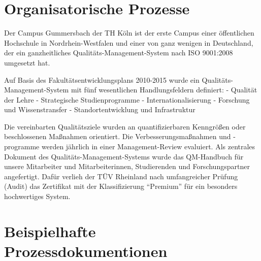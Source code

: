 \section{Organisatorische Prozesse}\label{organisatorische-prozesse}

Der Campus Gummersbach der TH Köln ist der erste Campus einer
öffentlichen Hochschule in Nordrhein-Westfalen und einer von ganz
wenigen in Deutschland, der ein ganzheitliches
Qualitäts-Management-System nach ISO 9001:2008 umgesetzt hat.

Auf Basis des Fakultätsentwicklungsplans 2010-2015 wurde ein
Qualitäts-Management-System mit fünf wesentlichen Handlungsfeldern
definiert: - Qualität der Lehre - Strategische Studienprogramme -
Internationalisierung - Forschung und Wissenstransfer -
Standortentwicklung und Infrastruktur

Die vereinbarten Qualitätsziele wurden an quantifizierbaren Kenngrößen
oder beschlossenen Maßnahmen orientiert. Die Verbesserungsmaßnahmen und
-programme werden jährlich in einer Management-Review evaluiert. Als
zentrales Dokument des Qualitäts-Management-Systems wurde das
QM-Handbuch für unsere Mitarbeiter und Mitarbeiterinnen, Studierenden
und Forschungspartner angefertigt. Dafür verlieh der TÜV Rheinland nach
umfangreicher Prüfung (Audit) das Zertifikat mit der Klassifizierung
``Premium'' für ein besonders hochwertiges System.

\section{Beispielhafte
Prozessdokumentionen}\label{beispielhafte-prozessdokumentionen}

